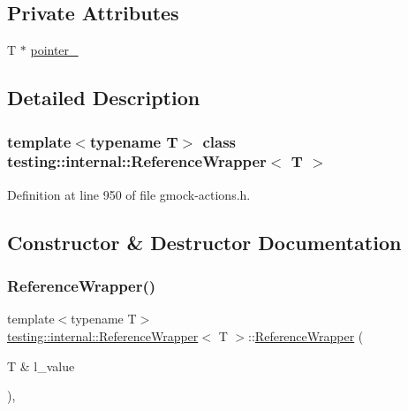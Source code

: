 \subsection*{Private Attributes}
\begin{DoxyCompactItemize}
\item 
T $\ast$ \hyperlink{classtesting_1_1internal_1_1ReferenceWrapper_abc085b4a0cdea43258c297c6989fdc7d}{pointer\+\_\+}
\end{DoxyCompactItemize}


\subsection{Detailed Description}
\subsubsection*{template$<$typename T$>$\newline
class testing\+::internal\+::\+Reference\+Wrapper$<$ T $>$}



Definition at line 950 of file gmock-\/actions.\+h.



\subsection{Constructor \& Destructor Documentation}
\mbox{\label{classtesting_1_1internal_1_1ReferenceWrapper_ad33597ffc478c3af9190d1a288a76d39}} 
\subsubsection{\texorpdfstring{Reference\+Wrapper()}{ReferenceWrapper()}}
{\footnotesize\ttfamily template$<$typename T$>$ \\
\hyperlink{classtesting_1_1internal_1_1ReferenceWrapper}{testing\+::internal\+::\+Reference\+Wrapper}$<$ T $>$\+::\hyperlink{classtesting_1_1internal_1_1ReferenceWrapper}{Reference\+Wrapper} (\begin{DoxyParamCaption}\item[{T \&}]{l\+\_\+value }\end{DoxyParamCaption})\hspace{0.3cm}{\ttfamily [inline]}, {\ttfamily [explicit]}}



